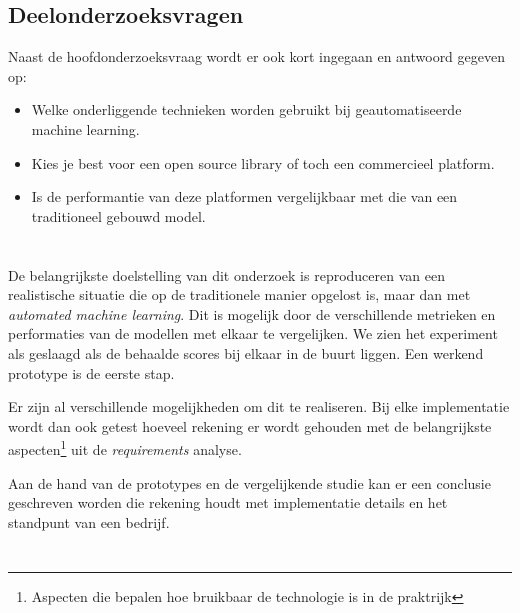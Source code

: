 \subsection{Deelonderzoeksvragen}
\label{subsec:deelonderzoeksvragen}

Naast de hoofdonderzoeksvraag wordt er ook kort ingegaan en antwoord gegeven op:

\begin{itemize}
    \item Welke onderliggende technieken worden gebruikt bij geautomatiseerde machine learning.
    \item Kies je best voor een open source library of toch een commercieel platform.
    \item Is de performantie van deze platformen vergelijkbaar met die van een traditioneel gebouwd model.
\end{itemize}

\section{}
\label{sec:onderzoeksdoelstelling}

De belangrijkste doelstelling van dit onderzoek is reproduceren van een realistische situatie die op de traditionele manier opgelost is, maar dan met \textit{automated machine learning}. Dit is mogelijk door de verschillende metrieken en performaties van de modellen met elkaar te vergelijken. We zien het experiment als geslaagd als de behaalde scores bij elkaar in de buurt liggen. Een werkend prototype is de eerste stap.

Er zijn al verschillende mogelijkheden om dit te realiseren. Bij elke implementatie wordt dan ook getest hoeveel rekening er wordt gehouden met de belangrijkste aspecten\footnote{Aspecten die bepalen hoe bruikbaar de technologie is in de praktrijk} uit de \textit{requirements} analyse.

Aan de hand van de prototypes en de vergelijkende studie kan er een conclusie geschreven worden die rekening houdt met implementatie details en het standpunt van een bedrijf.

\section{}
\label{sec:opzet-bachelorproef}

